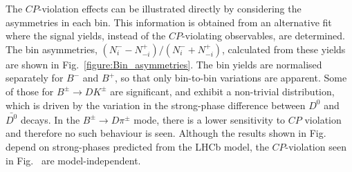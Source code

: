 \documentclass[12pt, a4paper, notitlepage, onecolumn]{article}
\begin{document}
The $C\!P$-violation effects can be illustrated directly by considering the asymmetries in each bin. This information is obtained from an alternative fit where the signal yields, instead of the $C\!P$-violating observables, are determined. The bin asymmetries, $(N_i^- - N_{-i}^+)/(N_i^- + N_{-i}^+)$, calculated from these yields are shown in Fig.~\ref{figure:Bin_asymmetries}. The bin yields are normalised separately for $B^-$ and $B^+$, so that only bin-to-bin variations are apparent. Some of those for $B^\pm\to DK^\pm$ are significant, and exhibit a non-trivial distribution, which is driven by the variation in the strong-phase difference between $D^0$ and $\bar{D^0}$ decays. In the $B^\pm\to D\pi^\pm$ mode, there is a lower sensitivity to $C\!P$ violation and therefore no such behaviour is seen. Although the results shown in Fig.~\cite{figure:CP_observables} depend on strong-phases predicted from the LHCb model, the $C\!P$-violation seen in Fig.~\cite{figure:Bin_asymmetries_DK} are model-independent.
\end{document}
